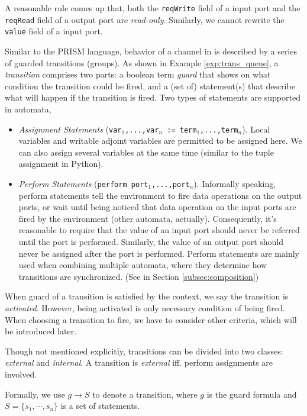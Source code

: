 A reasonable rule comes up that, both the \texttt{reqWrite} field of a input port and the \texttt{reqRead} field of a output port are \emph{read-only}. Similarly, we cannot rewrite the \texttt{value} field of a input port.

 Similar to the PRISM\cite{KwiatkowskaCav2011} language, behavior of a channel in \lang{} is described by a series of guarded transitions (groups). As shown in  Example \ref{exp:trans_queue}, a \emph{transition} comprises two parts: a boolean term \emph{guard} that shows on what condition the transition could be fired, and a (set of) statement(s) that describe what will happen if the transition is fired. Two types of statements are supported in automata,
\begin{itemize}
    \item \emph{Assignment Statements} (\texttt{var$_1$,...,var$_n$ := term$_1$,...,term$_n$}). Local variables and writable adjoint variables are permitted to be assigned here. We can also assign several variables at the same time (similar to the tuple assignment in Python).
    \item \emph{Perform Statements} (\texttt{perform port$_1$,...,port$_n$}). Informally speaking, perform statements tell the environment to fire data operations on the output ports, or wait until being noticed that data operation on the input ports are fired by the environment (other automata, actually). Consequently, it's reasonable to require that the value of an input port should never be referred until the port is performed. Similarly, the value of an output port should never be assigned after the port is performed. Perform statements are mainly used when combining multiple automata, where they determine how transitions are synchronized. (See in Section \ref{subsec:composition})
\end{itemize}

When guard of a transition is satisfied by the context, we say the transition is \emph{activated}. However, being activated is only necessary condition of being fired. When choosing a transition to fire, we have to consider other criteria, which will be introduced later.

Though not mentioned explicitly, transitions can be divided into two classes: \emph{external} and \emph{internal}. A transition is \emph{external} iff. perform assignments are involved. 

\begin{formalization}[Transitions]
Formally, we use $g\rightarrow S$ to denote a transition, where $g$ is the guard formula and $S=\{s_1,\cdots,s_n\}$ is a set of statements. 
\end{formalization}

